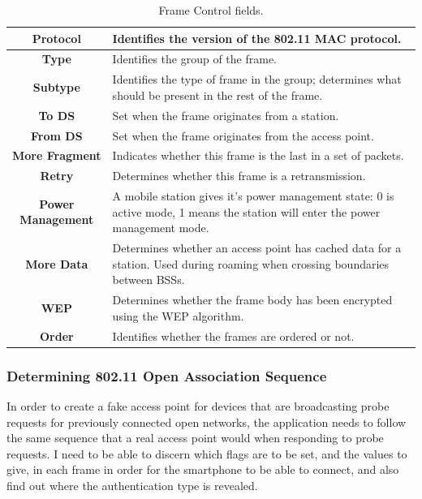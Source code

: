 \begin{table}[!h]
\begin{center}
	\begin{tabular}{ | c |  p{5cm} | }
 		\hline
		\textbf{Protocol} & Identifies the version of the 802.11 MAC protocol. \\ \hline
		\textbf{Type} & Identifies the group of the frame. \\ \hline
		\textbf{Subtype} & Identifies the type of frame in the group; determines what should be present in the rest of the frame. \\ \hline
		\textbf{To DS} & Set when the frame originates from a station. \\ \hline
		\textbf{From DS} & Set when the frame originates from the access point. \\ \hline
		\textbf{More Fragment} & Indicates whether this frame is the last in a set of packets. \\ \hline
		\textbf{Retry} & Determines whether this frame is a retransmission. \\ \hline
		\textbf{Power Management} & A mobile station gives it’s power management state: 0 is active mode, 1  means the station will enter the power management mode. \\ \hline
		\textbf{More Data} & Determines whether an access point has cached data for a station. Used during roaming when crossing boundaries between BSSs. \\ \hline
		\textbf{WEP} & Determines whether the frame body has been encrypted using the WEP \cite{research:wep} algorithm.  \\ \hline
		\textbf{Order} & Identifies whether the frames are ordered or not. \\ \hline
	\end{tabular}
		\caption{Frame Control fields.}
		\label{table:framecontrol}
\end{center}
\end{table}
\clearpage
\subsubsection{Determining 802.11 Open Association Sequence}
\label{research:assoc-seq}
In order to create a fake access point for devices that are broadcasting probe requests for previously connected open networks, the application needs to follow the same sequence that a real access point would when responding to probe requests. I need to be able to discern which flags are to be set, and the values to give, in each frame in order for the smartphone to be able to connect, and also find out where the authentication type is revealed. 

